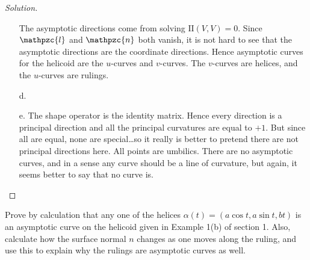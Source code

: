 \documentclass[Shifrin_Solutions_Spring_2018]{subfiles}
\begin{document}
\begin{proof}[Solution]
\begin{itemize}
The asymptotic directions come from solving $\mathrm{II}(V,V)=0$. Since $\mathpzc{l}$ and $\mathpzc{n}$ both vanish, it is not hard to see that the asymptotic directions are the coordinate directions. Hence asymptotic curves for the helicoid are the $u$-curves and $v$-curves. The $v$-curves are helices, and the $u$-curves are rulings.


\item[d.]

\item[e.] The shape operator is the identity matrix. Hence every direction is a principal direction and all the principal curvatures are equal to $+1$. But since all are equal, none are special\dots so it really is better to pretend there are not principal directions here. All points are umbilics. There are no asymptotic curves, and in a sense any curve should be a line of curvature, but again, it seems better to say that no curve is.

\end{itemize}
\end{proof}

\begin{exercise}
Prove by calculation that any one of the helices $\alpha(t) = \left( a\cos t , a\sin t , bt\right)$ is an asymptotic curve on the helicoid given in Example 1(b) of section 1. Also, calculate how the surface normal $n$ changes as one moves along the ruling, and use this to explain why the rulings are asymptotic curves as well.
\end{exercise}
\end{document}
